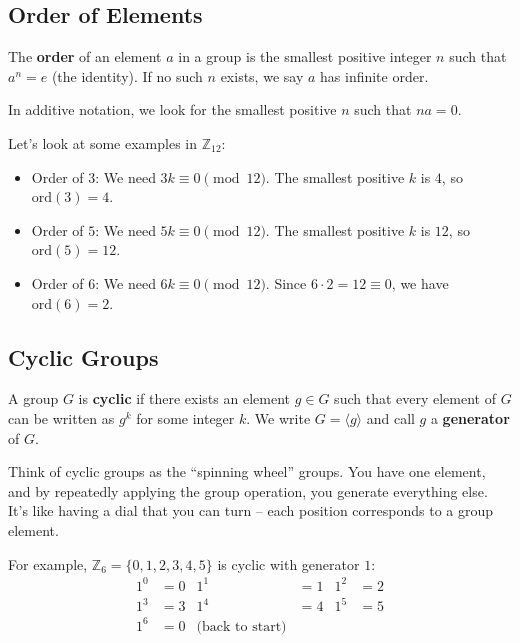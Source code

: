 \documentclass[12pt]{article}
\begin{document}
\subsection{\textcolor{HeaderColor}{Order of Elements}}

\begin{definitionbox}
The \textbf{order} of an element $a$ in a group is the smallest positive integer $n$ such that $a^n = e$ (the identity). If no such $n$ exists, we say $a$ has infinite order.

In additive notation, we look for the smallest positive $n$ such that $na = 0$.
\end{definitionbox}

Let's look at some examples in $\mathbb{Z}_{12}$:
\begin{itemize}
\item Order of $3$: We need $3k \equiv 0 \pmod{12}$. The smallest positive $k$ is $4$, so $\text{ord}(3) = 4$.
\item Order of $5$: We need $5k \equiv 0 \pmod{12}$. The smallest positive $k$ is $12$, so $\text{ord}(5) = 12$.
\item Order of $6$: We need $6k \equiv 0 \pmod{12}$. Since $6 \cdot 2 = 12 \equiv 0$, we have $\text{ord}(6) = 2$.
\end{itemize}

\subsection{\textcolor{HeaderColor}{Cyclic Groups}}

\begin{definitionbox}
A group $G$ is \textbf{cyclic} if there exists an element $g \in G$ such that every element of $G$ can be written as $g^k$ for some integer $k$. We write $G = \langle g \rangle$ and call $g$ a \textbf{generator} of $G$.
\end{definitionbox}

Think of cyclic groups as the ``spinning wheel'' groups. You have one element, and by repeatedly applying the group operation, you generate everything else. It's like having a dial that you can turn – each position corresponds to a group element.

For example, $\mathbb{Z}_6 = \{0, 1, 2, 3, 4, 5\}$ is cyclic with generator $1$:
\begin{align}
1^0 &= 0 & 1^1 &= 1 & 1^2 &= 2 \\
1^3 &= 3 & 1^4 &= 4 & 1^5 &= 5 \\
1^6 &= 0 & \text{(back to start)}
\end{align}
\end{document}
